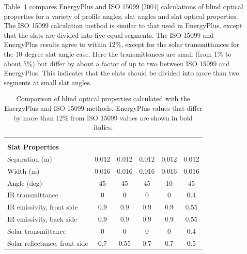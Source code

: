 Table~\ref{table:comparison-of-blind-optical-properties} compares EnergyPlus and ISO 15099 {[}2001{]} calculations of blind optical properties for a variety of profile angles, slat angles and slat optical properties. The ISO 15099 calculation method is similar to that used in EnergyPlus, except that the slats are divided into five equal segments. The ISO 15099 and EnergyPlus results agree to within 12\%, except for the solar transmittances for the 10-degree slat angle case. Here the transmittances are small (from 1\% to about 5\%) but differ by about a factor of up to two between ISO 15099 and EnergyPlus. This indicates that the slats should be divided into more than two segments at small slat angles.

\begin{longtable}[c]{p{1.0in}p{0.4in}p{0.4in}p{0.4in}p{0.4in}p{0.4in}p{0.4in}p{0.4in}p{0.4in}p{0.4in}p{0.4in}}
\caption{Comparison of blind optical properties calculated with the EnergyPlus and ISO 15099 methods. EnergyPlus values that differ by more than 12\% from ISO 15099 values are shown in bold italics.}\tabularnewline
\label{table:comparison-of-blind-optical-properties}\tabularnewline
\toprule 
\multicolumn{11}{l}{\textbf{Slat Properties}} \tabularnewline \midrule
Separation (m) & \multicolumn{2}{c}{0.012} & \multicolumn{2}{c}{0.012} & \multicolumn{2}{c}{0.012} & \multicolumn{2}{c}{0.012} & \multicolumn{2}{c}{0.012} \tabularnewline
Width (m) & \multicolumn{2}{c}{0.016} & \multicolumn{2}{c}{0.016} & \multicolumn{2}{c}{0.016} & \multicolumn{2}{c}{0.016} & \multicolumn{2}{c}{0.016} \tabularnewline
Angle (deg) & \multicolumn{2}{c}{45} & \multicolumn{2}{c}{45} & \multicolumn{2}{c}{45} & \multicolumn{2}{c}{10} & \multicolumn{2}{c}{45} \tabularnewline
IR transmittance & \multicolumn{2}{c}{0} & \multicolumn{2}{c}{0} & \multicolumn{2}{c}{0} & \multicolumn{2}{c}{0} & \multicolumn{2}{c}{0.4} \tabularnewline
IR emissivity, front side & \multicolumn{2}{c}{0.9} & \multicolumn{2}{c}{0.9} & \multicolumn{2}{c}{0.9} & \multicolumn{2}{c}{0.9} & \multicolumn{2}{c}{0.55} \tabularnewline
IR emissivity, back side & \multicolumn{2}{c}{0.9} & \multicolumn{2}{c}{0.9} & \multicolumn{2}{c}{0.9} & \multicolumn{2}{c}{0.9} & \multicolumn{2}{c}{0.55} \tabularnewline
Solar transmittance & \multicolumn{2}{c}{0} & \multicolumn{2}{c}{0} & \multicolumn{2}{c}{0} & \multicolumn{2}{c}{0} & \multicolumn{2}{c}{0.4} \tabularnewline
Solar reflectance, front side & \multicolumn{2}{c}{0.7} & \multicolumn{2}{c}{0.55} & \multicolumn{2}{c}{0.7} & \multicolumn{2}{c}{0.7} & \multicolumn{2}{c}{0.5} \tabularnewline

\end{longtable}
